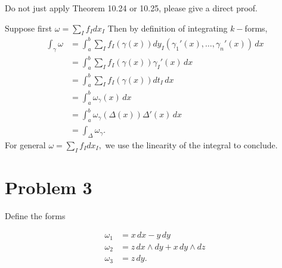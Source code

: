 \documentclass[11pt]{article}
\begin{document}
Do not just apply Theorem 10.24 or 10.25, please give a direct proof.
\begin{solution}
Suppose first $\omega = \sum_I f_I dx_I$ Then by definition of integrating $k-$forms,
    \begin{align*}
        \int_\gamma \omega &= \int_a^b  \sum_{I}f_I(\gamma(x))dy_I(\gamma_1'(x), \dots,\gamma_n'(x))\,dx\\
        &= \int_a^b \sum_{I} f_I(\gamma(x))\gamma_I'(x)\,dx\\
        &= \int_a^b \sum_If_I(\gamma(x))dt_I\,dx\\
        &=\int_a^b \omega_\gamma(x)\,dx\\
        &= \int_a^b \omega_\gamma(\Delta(x)) \Delta'(x)\,dx\\
        &= \int_\Delta \omega_\gamma.
    \end{align*}
    For general $\omega= \sum_I f_I dx_I,$ we use the linearity of the integral to conclude. 
\end{solution}


\newpage

\section*{Problem 3}

Define the forms

\begin{align*}
\omega_1 &= x \, dx - y \, dy \\
\omega_2 &= z \, dx \wedge dy + x \, dy \wedge dz \\
\omega_3 &= z \, dy.
\end{align*}
\end{document}
